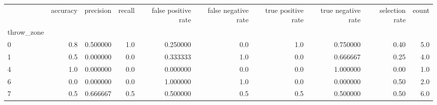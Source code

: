 \begin{tabular}{lrrrrrrrrr}
\toprule
{} &  accuracy &  precision &  recall &  false positive rate &  false negative rate &  true positive rate &  true negative rate &  selection rate &  count \\
throw\_zone &           &            &         &                      &                      &                     &                     &                 &        \\
\midrule
0          &       0.8 &   0.500000 &     1.0 &             0.250000 &                  0.0 &                 1.0 &            0.750000 &            0.40 &    5.0 \\
1          &       0.5 &   0.000000 &     0.0 &             0.333333 &                  1.0 &                 0.0 &            0.666667 &            0.25 &    4.0 \\
4          &       1.0 &   0.000000 &     0.0 &             0.000000 &                  0.0 &                 0.0 &            1.000000 &            0.00 &    1.0 \\
6          &       0.0 &   0.000000 &     0.0 &             1.000000 &                  1.0 &                 0.0 &            0.000000 &            0.50 &    2.0 \\
7          &       0.5 &   0.666667 &     0.5 &             0.500000 &                  0.5 &                 0.5 &            0.500000 &            0.50 &    6.0 \\
\bottomrule
\end{tabular}
